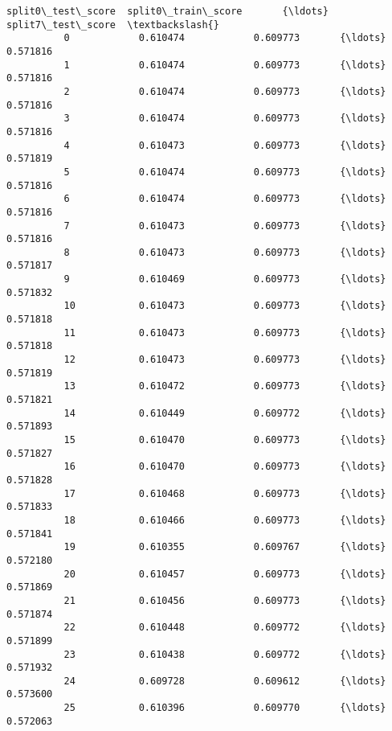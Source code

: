 \documentclass[11pt]{article}
\begin{document}
\begin{Verbatim}[commandchars=\\\{\}]
              split0\_test\_score  split0\_train\_score       {\ldots}         split7\_test\_score  \textbackslash{}
          0            0.610474            0.609773       {\ldots}                  0.571816   
          1            0.610474            0.609773       {\ldots}                  0.571816   
          2            0.610474            0.609773       {\ldots}                  0.571816   
          3            0.610474            0.609773       {\ldots}                  0.571816   
          4            0.610473            0.609773       {\ldots}                  0.571819   
          5            0.610474            0.609773       {\ldots}                  0.571816   
          6            0.610474            0.609773       {\ldots}                  0.571816   
          7            0.610473            0.609773       {\ldots}                  0.571816   
          8            0.610473            0.609773       {\ldots}                  0.571817   
          9            0.610469            0.609773       {\ldots}                  0.571832   
          10           0.610473            0.609773       {\ldots}                  0.571818   
          11           0.610473            0.609773       {\ldots}                  0.571818   
          12           0.610473            0.609773       {\ldots}                  0.571819   
          13           0.610472            0.609773       {\ldots}                  0.571821   
          14           0.610449            0.609772       {\ldots}                  0.571893   
          15           0.610470            0.609773       {\ldots}                  0.571827   
          16           0.610470            0.609773       {\ldots}                  0.571828   
          17           0.610468            0.609773       {\ldots}                  0.571833   
          18           0.610466            0.609773       {\ldots}                  0.571841   
          19           0.610355            0.609767       {\ldots}                  0.572180   
          20           0.610457            0.609773       {\ldots}                  0.571869   
          21           0.610456            0.609773       {\ldots}                  0.571874   
          22           0.610448            0.609772       {\ldots}                  0.571899   
          23           0.610438            0.609772       {\ldots}                  0.571932   
          24           0.609728            0.609612       {\ldots}                  0.573600   
          25           0.610396            0.609770       {\ldots}                  0.572063   

\end{Verbatim}
\end{document}
